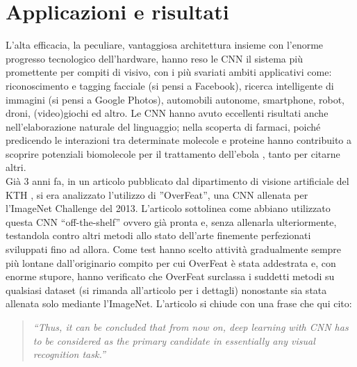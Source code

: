 \section{Applicazioni e risultati}
L'alta efficacia, la peculiare, vantaggiosa architettura insieme con l'enorme progresso tecnologico dell'hardware, hanno reso le CNN il sistema più promettente per compiti di visivo, con i più svariati ambiti applicativi come: riconoscimento e tagging facciale (si pensi a Facebook), ricerca intelligente di immagini (si pensi a Google Photos), automobili autonome, smartphone, robot, droni, (video)giochi ed altro. Le CNN hanno avuto eccellenti risultati anche nell'elaborazione naturale del linguaggio; nella scoperta di farmaci, poiché predicendo le interazioni tra determinate molecole e proteine hanno contribuito a scoprire potenziali biomolecole per il trattamento dell'ebola \parencite{WCNN}, tanto per citarne altri.\\
Già 3 anni fa, in un articolo pubblicato dal dipartimento di visione artificiale del KTH \parencite{Overfeat}, si era analizzato l'utilizzo di ”OverFeat”, una CNN allenata per l'ImageNet Challenge del 2013. L'articolo sottolinea come abbiano utilizzato questa CNN “off-the-shelf” ovvero già pronta e, senza allenarla ulteriormente, testandola contro altri metodi allo stato dell'arte finemente perfezionati sviluppati fino ad allora. Come test hanno scelto attività gradualmente sempre più lontane dall'originario compito per cui OverFeat è stata addestrata e, con enorme stupore, hanno verificato che OverFeat surclassa i suddetti metodi su qualsiasi dataset (si rimanda all'articolo per i dettagli) nonostante sia stata allenata solo mediante l'ImageNet. L'articolo si chiude con una frase che qui cito:
\begin{quote}
\emph{“Thus, it can be concluded that from now on, deep learning with CNN has to be considered as the primary candidate in essentially any visual recognition task.”}
\end{quote}\\

